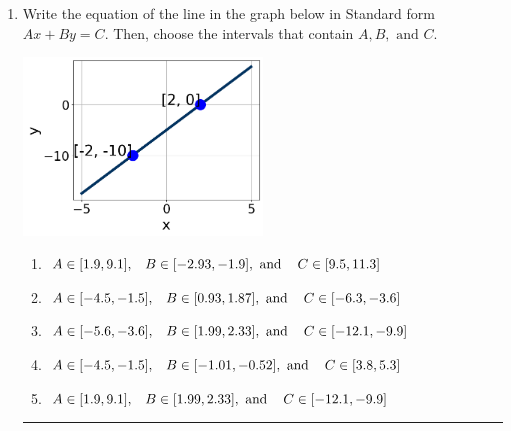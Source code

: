 \documentclass[14pt]{extbook}
\newcommand{\litem}[1]{\item#1\hspace*{-1cm}\rule{\textwidth}{0.4pt}}
\begin{document}
\begin{enumerate}
\litem{
Write the equation of the line in the graph below in Standard form $Ax+By=C$. Then, choose the intervals that contain $A, B, \text{ and } C$.
\begin{center}
    \includegraphics[width=0.5\textwidth]{../Figures/linearGraphToStandardA.png}
\end{center}
\begin{enumerate}[label=\Alph*.]
\item \( A \in [1.9, 9.1], \hspace{3mm} B \in [-2.93, -1.9], \text{ and } \hspace{3mm} C \in [9.5, 11.3] \)
\item \( A \in [-4.5, -1.5], \hspace{3mm} B \in [0.93, 1.87], \text{ and } \hspace{3mm} C \in [-6.3, -3.6] \)
\item \( A \in [-5.6, -3.6], \hspace{3mm} B \in [1.99, 2.33], \text{ and } \hspace{3mm} C \in [-12.1, -9.9] \)
\item \( A \in [-4.5, -1.5], \hspace{3mm} B \in [-1.01, -0.52], \text{ and } \hspace{3mm} C \in [3.8, 5.3] \)
\item \( A \in [1.9, 9.1], \hspace{3mm} B \in [1.99, 2.33], \text{ and } \hspace{3mm} C \in [-12.1, -9.9] \)


\end{enumerate}}
\end{enumerate}
\end{document}
